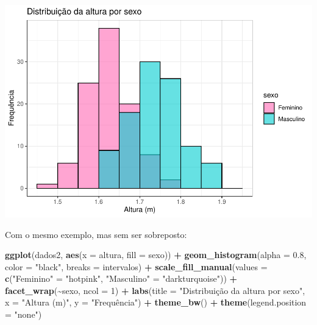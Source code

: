 \documentclass[
]{book}
\newenvironment{Shaded}{\begin{snugshade}}{\end{snugshade}}
\newcommand{\AttributeTok}[1]{\textcolor[rgb]{0.13,0.29,0.53}{#1}}
\newcommand{\DecValTok}[1]{\textcolor[rgb]{0.00,0.00,0.81}{#1}}
\newcommand{\FloatTok}[1]{\textcolor[rgb]{0.00,0.00,0.81}{#1}}
\newcommand{\FunctionTok}[1]{\textcolor[rgb]{0.13,0.29,0.53}{\textbf{#1}}}
\newcommand{\NormalTok}[1]{#1}
\newcommand{\OtherTok}[1]{\textcolor[rgb]{0.56,0.35,0.01}{#1}}
\newcommand{\SpecialCharTok}[1]{\textcolor[rgb]{0.81,0.36,0.00}{\textbf{#1}}}
\newcommand{\StringTok}[1]{\textcolor[rgb]{0.31,0.60,0.02}{#1}}
\begin{document}
\begin{center}\includegraphics{AED_files/figure-latex/histograma2-1} \end{center}

Com o mesmo exemplo, mas sem ser sobreposto:

\begin{Shaded}
\begin{Highlighting}[]
\FunctionTok{ggplot}\NormalTok{(dados2, }\FunctionTok{aes}\NormalTok{(}\AttributeTok{x =}\NormalTok{ altura, }\AttributeTok{fill =}\NormalTok{ sexo)) }\SpecialCharTok{+}
  \FunctionTok{geom\_histogram}\NormalTok{(}\AttributeTok{alpha =} \FloatTok{0.8}\NormalTok{, }\AttributeTok{color =} \StringTok{"black"}\NormalTok{, }\AttributeTok{breaks =}\NormalTok{ intervalos) }\SpecialCharTok{+}
  \FunctionTok{scale\_fill\_manual}\NormalTok{(}\AttributeTok{values =} \FunctionTok{c}\NormalTok{(}\StringTok{"Feminino"} \OtherTok{=} \StringTok{"hotpink"}\NormalTok{,  }
                               \StringTok{"Masculino"} \OtherTok{=} \StringTok{"darkturquoise"}\NormalTok{)) }\SpecialCharTok{+}
  \FunctionTok{facet\_wrap}\NormalTok{(}\SpecialCharTok{\textasciitilde{}}\NormalTok{sexo, }\AttributeTok{ncol =} \DecValTok{1}\NormalTok{) }\SpecialCharTok{+}  
  \FunctionTok{labs}\NormalTok{(}\AttributeTok{title =} \StringTok{"Distribuição da altura por sexo"}\NormalTok{,}
       \AttributeTok{x =} \StringTok{"Altura (m)"}\NormalTok{, }\AttributeTok{y =} \StringTok{"Frequência"}\NormalTok{) }\SpecialCharTok{+}
  \FunctionTok{theme\_bw}\NormalTok{() }\SpecialCharTok{+}
  \FunctionTok{theme}\NormalTok{(}\AttributeTok{legend.position =} \StringTok{"none"}\NormalTok{)}
\end{Highlighting}
\end{Shaded}
\end{document}
